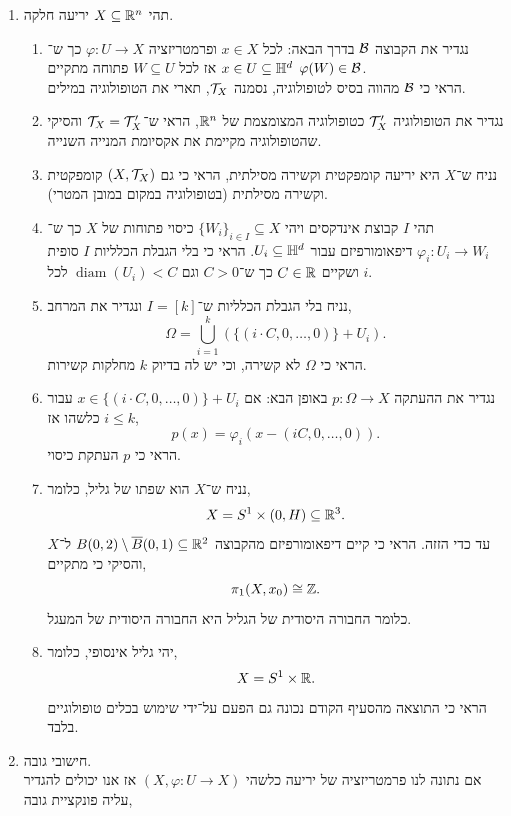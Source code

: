 \begin{enumerate}
	\item
		תהי $X \subseteq \mathbb{R}^n$ יריעה חלקה.
		\begin{enumerate}
			\item נגדיר את הקבוצה $\mathcal{B}$ בדרך הבאה:
				לכל $x \in X$ ופרמטריזציה $\varphi : U \to X$ כך ש־$x \in U \subseteq \mathbb{H}^d$ אז לכל $W \subseteq U$ פתוחה מתקיים $\varphi(W) \in \mathcal{B}$. \\
				הראי כי $\mathcal{B}$ מהווה בסיס לטופולוגיה, נסמנה $\mathcal{T}_X$, תארי את הטופולוגיה במילים.
			\item נגדיר את הטופולוגיה $\mathcal{T}_X'$ כטופולוגיה המצומצמת של $\mathbb{R}^n$,
				הראי ש־$\mathcal{T}_X = \mathcal{T}_X'$ והסיקי שהטופולוגיה מקיימת את אקסיומת המנייה השנייה.
			\item נניח ש־$X$ היא יריעה קומפקטית וקשירה מסילתית, הראי כי גם $(X, \mathcal{T}_X)$ קומפקטית וקשירה מסילתית (בטופולוגיה במקום במובן המטרי).
			\item תהי $I$ קבוצת אינדקסים ויהי ${\{ W_i \}}_{i \in I} \subseteq X$ כיסוי פתוחות של $X$ כך ש־$\varphi_i : U_i \to W_i$ דיפאומורפיזם עבור $U_i \subseteq \mathbb{H}^d$.
				הראי כי בלי הגבלת הכלליות $I$ סופית ושקיים $C \in \mathbb{R}$ כך ש־$C > 0$ וגם $\operatorname{diam}(U_i) < C$ לכל $i$.
			\item נניח בלי הגבלת הכלליות ש־$I = [k]$ ונגדיר את המרחב,
				\[
					\Omega
					= \bigcup_{i = 1}^k (\{ (i \cdot C, 0, \ldots, 0) \} + U_i)
				.\]
				הראי כי $\Omega$ לא קשירה, וכי יש לה בדיוק $k$ מחלקות קשירות.
			\item נגדיר את ההעתקה $p : \Omega \to X$ באופן הבא:
				אם $x \in \{ (i \cdot C, 0, \ldots, 0) \} + U_i$ עבור $i \le k$ כלשהו אז,
				\[
					p(x)
					= \varphi_i(x - (i C, 0, \ldots, 0))
				.\]
				הראי כי $p$ העתקת כיסוי.
			\item נניח ש־$X$ הוא שפתו של גליל, כלומר,
				\[
					X = S^1 \times (0, H)
					\subseteq \mathbb{R}^3
				.\]
				עד כדי הזזה.
				הראי כי קיים דיפאומורפיזם מהקבוצה $B(0, 2) \setminus \overline{B}(0, 1) \subseteq \mathbb{R}^2$ ל־$X$ והסיקי כי מתקיים,
				\[
					\pi_1(X, x_0)
					\cong \mathbb{Z}
				.\]
				כלומר החבורה היסודית של הגליל היא החבורה היסודית של המעגל.
			\item יהי גליל אינסופי, כלומר,
				\[
					X = S^1 \times \mathbb{R}
				.\]
				הראי כי התוצאה מהסעיף הקודם נכונה גם הפעם על־ידי שימוש בכלים טופולוגיים בלבד.
		\end{enumerate}
	\item חישובי גובה. \\
		אם נתונה לנו פרמטריזציה של יריעה כלשהי $(X, \varphi : U \to X)$ אז אנו יכולים להגדיר עליה פונקציית גובה,

\end{enumerate}
